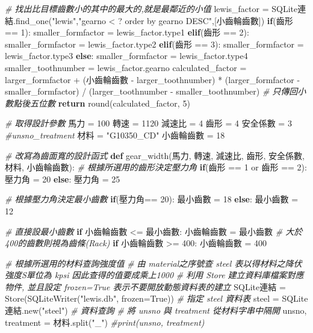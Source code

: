 \documentclass[]{article}
\newenvironment{Shaded}{}{}
\newcommand{\KeywordTok}[1]{\textcolor[rgb]{0.00,0.44,0.13}{\textbf{{#1}}}}
\newcommand{\DataTypeTok}[1]{\textcolor[rgb]{0.56,0.13,0.00}{{#1}}}
\newcommand{\DecValTok}[1]{\textcolor[rgb]{0.25,0.63,0.44}{{#1}}}
\newcommand{\StringTok}[1]{\textcolor[rgb]{0.25,0.44,0.63}{{#1}}}
\newcommand{\CommentTok}[1]{\textcolor[rgb]{0.38,0.63,0.69}{\textit{{#1}}}}
\newcommand{\OtherTok}[1]{\textcolor[rgb]{0.00,0.44,0.13}{{#1}}}
\newcommand{\NormalTok}[1]{{#1}}
\begin{document}
\begin{Shaded}
\begin{Highlighting}[]
    \CommentTok{# 找出比目標齒數小的其中的最大的,就是最鄰近的小值}
    \NormalTok{lewis_factor = SQLite連結.find_one(}\StringTok{"lewis"}\NormalTok{,}\StringTok{"gearno < ? order by gearno DESC"}\NormalTok{,[小齒輪齒數])}
    \KeywordTok{if}\NormalTok{(齒形 == }\DecValTok{1}\NormalTok{):}
        \NormalTok{smaller_formfactor = lewis_factor.type1}
    \KeywordTok{elif}\NormalTok{(齒形 == }\DecValTok{2}\NormalTok{):}
        \NormalTok{smaller_formfactor = lewis_factor.type2}
    \KeywordTok{elif}\NormalTok{(齒形 == }\DecValTok{3}\NormalTok{):}
        \NormalTok{smaller_formfactor = lewis_factor.type3}
    \KeywordTok{else}\NormalTok{:}
        \NormalTok{smaller_formfactor = lewis_factor.type4}
    \NormalTok{smaller_toothnumber = lewis_factor.gearno}
    \NormalTok{calculated_factor = larger_formfactor + (小齒輪齒數 - larger_toothnumber) * (larger_formfactor - smaller_formfactor) / (larger_toothnumber - smaller_toothnumber)}
    \CommentTok{# 只傳回小數點後五位數}
    \KeywordTok{return} \DataTypeTok{round}\NormalTok{(calculated_factor, }\DecValTok{5}\NormalTok{)}

\CommentTok{# 取得設計參數}
\NormalTok{馬力 = }\DecValTok{100}
\NormalTok{轉速 = }\DecValTok{1120}
\NormalTok{減速比 = }\DecValTok{4}
\NormalTok{齒形 = }\DecValTok{4}
\NormalTok{安全係數 = }\DecValTok{3}
\CommentTok{#unsno_treatment}
\NormalTok{材料 = }\StringTok{"G10350_CD"}
\NormalTok{小齒輪齒數 = }\DecValTok{18}

\CommentTok{# 改寫為齒面寬的設計函式}
\KeywordTok{def} \NormalTok{gear_width(馬力, 轉速, 減速比, 齒形, 安全係數, 材料, 小齒輪齒數):}
    \CommentTok{# 根據所選用的齒形決定壓力角}
    \KeywordTok{if}\NormalTok{(齒形 == }\DecValTok{1} \NormalTok{or 齒形 == }\DecValTok{2}\NormalTok{):}
        \NormalTok{壓力角 = }\DecValTok{20}
    \KeywordTok{else}\NormalTok{:}
        \NormalTok{壓力角 = }\DecValTok{25}

    \CommentTok{# 根據壓力角決定最小齒數}
    \KeywordTok{if}\NormalTok{(壓力角== }\DecValTok{20}\NormalTok{):}
        \NormalTok{最小齒數 = }\DecValTok{18}
    \KeywordTok{else}\NormalTok{:}
        \NormalTok{最小齒數 = }\DecValTok{12}

    \CommentTok{# 直接設最小齒數}
    \KeywordTok{if} \NormalTok{小齒輪齒數 <= 最小齒數:}
        \NormalTok{小齒輪齒數 = 最小齒數}
    \CommentTok{# 大於400的齒數則視為齒條(Rack)}
    \KeywordTok{if} \NormalTok{小齒輪齒數 >= }\DecValTok{400}\NormalTok{:}
        \NormalTok{小齒輪齒數 = }\DecValTok{400}

    \CommentTok{# 根據所選用的材料查詢強度值}
    \CommentTok{# 由 material之序號查 steel 表以得材料之降伏強度S單位為 kpsi 因此查得的值要成乘上1000}
    \CommentTok{# 利用 Store  建立資料庫檔案對應物件, 並且設定 frozen=True 表示不要開放動態資料表的建立}
    \NormalTok{SQLite連結 = Store(SQLiteWriter(}\StringTok{"lewis.db"}\NormalTok{, frozen=}\OtherTok{True}\NormalTok{))}
    \CommentTok{# 指定 steel 資料表}
    \NormalTok{steel = SQLite連結.new(}\StringTok{"steel"}\NormalTok{)}
    \CommentTok{# 資料查詢}
    \CommentTok{# 將 unsno 與 treatment 從材料字串中隔開}
    \NormalTok{unsno, treatment = 材料.split(}\StringTok{"_"}\NormalTok{)}
    \CommentTok{#print(unsno, treatment)}


\end{Highlighting}
\end{Shaded}
\end{document}
